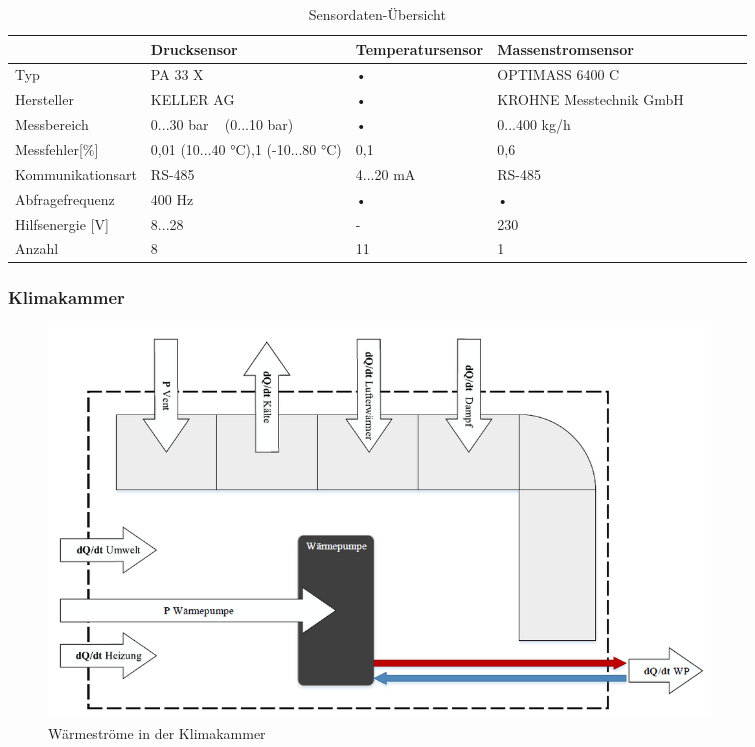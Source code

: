 \begin{table}[htb]
\centering
\caption{Sensordaten-Übersicht}\vspace{6pt}
\label{tab:Messtechnik KA}
\begin{tabular}{p{3cm}p{3cm}p{3cm}p{3.5cm}llll}
\hline 
 & \textbf{Drucksensor} & \textbf{Temperatursensor} & \textbf{Massenstromsensor} \\ 
\hline 
\hline 
Typ & PA 33 X & • & OPTIMASS 6400 C \\ 
\hline 
Hersteller & KELLER AG & • &  KROHNE Messtechnik GmbH \\ 
\hline 
Messbereich & 0...30 bar ~ (0...10 bar) & • & 0...400 kg/h \\ 
\hline 
Messfehler[$\%$] & 0,01 (10...40 °C)\newline 0,1 (-10...80 °C) & 0,1  & 0,6 \\ 
\hline 
Kommunikationsart & RS-485 & 4...20 mA & RS-485 \\ 
\hline 
Abfragefrequenz & 400 Hz & • & • \\ 
\hline 
Hilfsenergie [V] & 8...28 & - & 230  \\ 
\hline
Anzahl & 8  & 11 & 1 \\ 
\hline 
\hline 
\end{tabular} 
\label{tab:Tabelle}
\end{table}

\newpage
\subsubsection{Klimakammer}
\label{subsec:Klimakammer}
\begin{figure}[htb]
\centering		\includegraphics[width=0.850\textwidth]{Pictures/HIL2.png}
\caption{Wärmeströme in der Klimakammer \citep{Nuerenberg2015}}
\label{fig:KK}
\end{figure}


